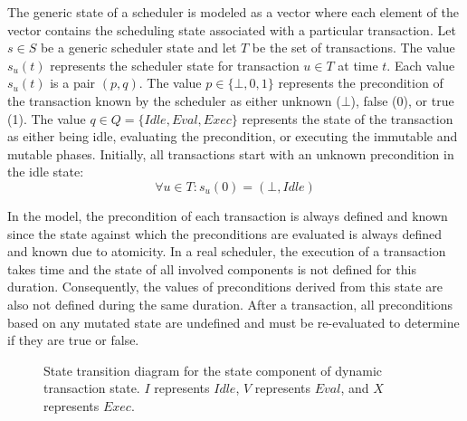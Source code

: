 The generic state of a scheduler is modeled as a vector where each element of the vector contains the scheduling state associated with a particular transaction.
Let $s \in S$ be a generic scheduler state and let $T$ be the set of transactions.
The value $s_u(t)$ represents the scheduler state for transaction $u \in T$ at time $t$.
Each value $s_u(t)$ is a pair $(p, q)$.
The value $p \in \{\bot, 0, 1\}$ represents the precondition of the transaction known by the scheduler as either unknown ($\bot$), false (0), or true (1).
The value $q \in Q = \{\mathit{Idle}, \mathit{Eval}, \mathit{Exec}\}$ represents the state of the transaction as either being idle, evaluating the precondition, or executing the immutable and mutable phases.
Initially, all transactions start with an unknown precondition in the idle state:
\begin{equation}
  \forall u \in T : s_u(0) = (\bot, \mathit{Idle})
\end{equation}

In the model, the precondition of each transaction is always defined and known since the state against which the preconditions are evaluated is always defined and known due to atomicity.
In a real scheduler, the execution of a transaction takes time and the state of all involved components is not defined for this duration.
Consequently, the values of preconditions derived from this state are also not defined during the same duration.
After a transaction, all preconditions based on any mutated state are undefined and must be re-evaluated to determine if they are true or false.

\begin{figure}
\centering
\caption{State transition diagram for the state component of dynamic transaction state.
  $I$ represents $\mathit{Idle}$, $V$ represents $\mathit{Eval}$, and $X$ represents $\mathit{Exec}$.
  \label{dt_state}}
\end{figure}


